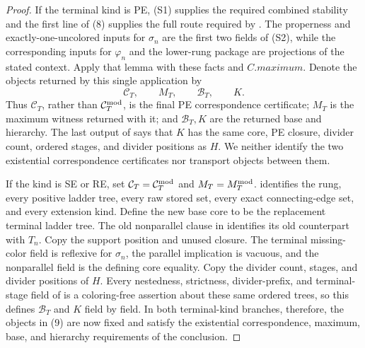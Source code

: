 \begin{proof}
If the terminal kind is PE, (S1) supplies the required combined stability
and the first line of (8) supplies the full route required by
.  The properness and exactly-one-uncolored
inputs for \(\sigma_n\) are the first two fields of (S2), while the
corresponding inputs for \(\varphi_n\) and the lower-rung package are
projections of the stated context.  Apply that lemma with these facts and
\(C.\mathit{maximum}\).  Denote the
objects returned by this single application by
\[
 \mathcal C_T,\qquad M_T,\qquad \mathcal B_T,\qquad K.          \tag{9}
\]
Thus \(\mathcal C_T\), rather than \(\mathcal C_T^{\rm mod}\), is the
final PE correspondence certificate; \(M_T\) is the maximum witness
returned with it; and \(\mathcal B_T,K\) are the returned base and
hierarchy.  The last output of  says that
\(K\) has the same core, PE closure, divider count, ordered stages, and
divider positions as \(H\).  We neither identify the two existential
correspondence certificates nor transport objects between them.

If the kind is SE or RE, set
\(\mathcal C_T=\mathcal C_T^{\rm mod}\) and \(M_T=M_T^{\rm mod}\).
 identifies the rung, every
positive ladder tree, every raw stored set, every exact connecting-edge
set, and every extension kind.  Define the new base core to be the
replacement terminal ladder tree.  The old nonparallel clause in
 identifies its old counterpart with \(T_n\).
Copy the support position and unused closure.  The terminal missing-color
field is reflexive for \(\sigma_n\), the parallel implication is vacuous,
and the nonparallel field is the defining core equality.  Copy the
divider count, stages, and divider positions of \(H\).  Every nestedness,
strictness, divider-prefix, and terminal-stage field of
 is a coloring-free assertion about these
same ordered trees, so this defines \(\mathcal B_T\) and \(K\) field by
field.  In both terminal-kind branches, therefore, the objects in (9)
are now fixed and satisfy the existential correspondence, maximum,
base, and hierarchy requirements of the conclusion.


\end{proof}
